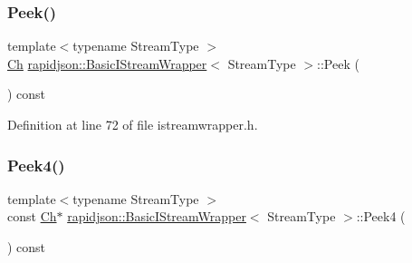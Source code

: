 \mbox{\label{classrapidjson_1_1_basic_i_stream_wrapper_adfae250fbfdf7dda0ee9b3895758e767}} 
\subsubsection{\texorpdfstring{Peek()}{Peek()}}
{\footnotesize\ttfamily template$<$typename Stream\+Type $>$ \\
\mbox{\hyperlink{classrapidjson_1_1_basic_i_stream_wrapper_a5fd972d8cd20b90ba0772aeebf122597}{Ch}} \mbox{\hyperlink{classrapidjson_1_1_basic_i_stream_wrapper}{rapidjson\+::\+Basic\+I\+Stream\+Wrapper}}$<$ Stream\+Type $>$\+::Peek (\begin{DoxyParamCaption}{ }\end{DoxyParamCaption}) const}



Definition at line 72 of file istreamwrapper.\+h.


\begin{DoxyCode}{0}

\end{DoxyCode}
\mbox{\label{classrapidjson_1_1_basic_i_stream_wrapper_afaece8ea8d7b73abc0d4942070b41f8a}} 
\subsubsection{\texorpdfstring{Peek4()}{Peek4()}}
{\footnotesize\ttfamily template$<$typename Stream\+Type $>$ \\
const \mbox{\hyperlink{classrapidjson_1_1_basic_i_stream_wrapper_a5fd972d8cd20b90ba0772aeebf122597}{Ch}}$\ast$ \mbox{\hyperlink{classrapidjson_1_1_basic_i_stream_wrapper}{rapidjson\+::\+Basic\+I\+Stream\+Wrapper}}$<$ Stream\+Type $>$\+::Peek4 (\begin{DoxyParamCaption}{ }\end{DoxyParamCaption}) const}



